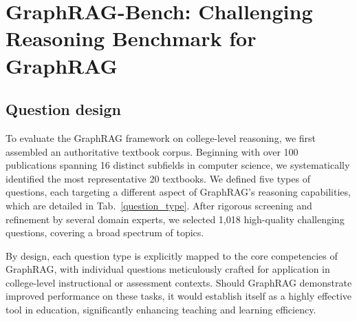 \documentclass{article}
\begin{document}
\section{GraphRAG-Bench: Challenging Reasoning Benchmark for GraphRAG} 
\subsection{Question design}
To evaluate the GraphRAG framework on college-level reasoning, we first assembled an authoritative textbook corpus. Beginning with over 100 publications spanning 16 distinct subfields in computer science, we systematically identified the most representative 20 textbooks. We defined five types of questions, each targeting a different aspect of GraphRAG's reasoning capabilities, which are detailed in Tab.~\ref{question_type}. After rigorous screening and refinement by several domain experts, we selected 1,018 high-quality challenging questions, covering a broad spectrum of topics.

By design, each question type is explicitly mapped to the core competencies of GraphRAG, with individual questions meticulously crafted for application in college-level instructional or assessment contexts. Should GraphRAG demonstrate improved performance on these tasks, it would establish itself as a highly effective tool in education, significantly enhancing teaching and learning efficiency.
\end{document}
